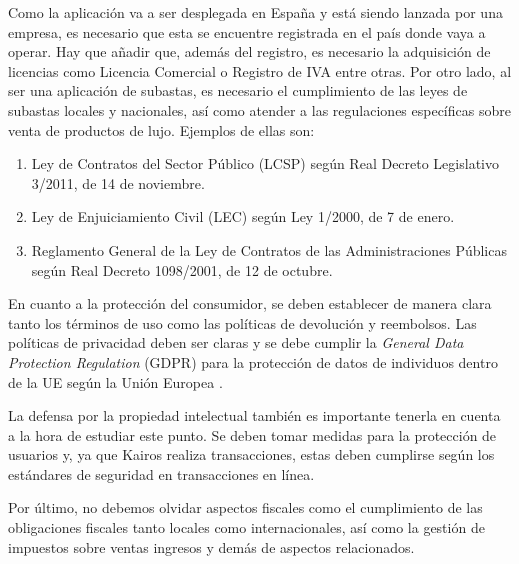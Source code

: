 	Como la aplicación va a ser desplegada en España y está siendo lanzada por una empresa, es necesario que esta se encuentre registrada en el país donde vaya a operar. Hay que añadir que, además del registro, es necesario la adquisición de licencias como Licencia Comercial o Registro de IVA entre otras. Por otro lado, al ser una aplicación de subastas, es necesario el cumplimiento de las leyes de subastas locales y nacionales, así como atender a las regulaciones específicas sobre venta de productos de lujo. Ejemplos de ellas son:
	\begin{enumerate}
		\item Ley de Contratos del Sector Público (LCSP) según Real Decreto Legislativo 3/2011, de 14 de noviembre. \cite{leySectorPublico}
		\item Ley de Enjuiciamiento Civil (LEC) según Ley 1/2000, de 7 de enero. \cite{leyEnjuiciamiento}
		\item Reglamento General de la Ley de Contratos de las Administraciones Públicas según Real Decreto 1098/2001, de 12 de octubre. \cite{leyContratos}
	\end{enumerate}
	
	En cuanto a la protección del consumidor, se deben establecer de manera clara tanto los términos de uso como las políticas de devolución y reembolsos. Las políticas de privacidad deben ser claras y se debe cumplir la \emph{General Data Protection Regulation} (GDPR) para la protección de datos de individuos dentro de la UE según la Unión Europea \cite{RGPD}.
	
	La defensa por la propiedad intelectual también es importante tenerla en cuenta a la hora de estudiar este punto. Se deben tomar medidas para la protección de usuarios y, ya que Kairos realiza transacciones, estas deben cumplirse según los estándares de seguridad en transacciones en línea.
	
	Por último, no debemos olvidar aspectos fiscales como el cumplimiento de las obligaciones fiscales tanto locales como internacionales, así como la gestión de impuestos sobre ventas ingresos y demás de aspectos relacionados.	


